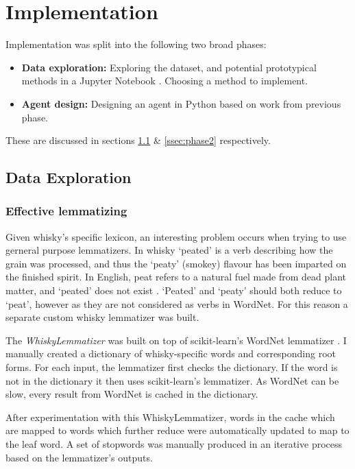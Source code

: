 \section{Implementation}\label{sec:imp}

Implementation was split into the following two broad phases:
\begin{itemize}
    \item \textbf{Data exploration:} Exploring the dataset, and potential prototypical methods in 
    a Jupyter Notebook \cite{Kluyver2016jupyter}. Choosing a method to implement.
    \item \textbf{Agent design:} Designing an agent in Python based on work from previous phase.
\end{itemize}
These are discussed in sections \ref{ssec:phase1} \& \ref{ssec:phase2} respectively.

\subsection{Data Exploration}\label{ssec:phase1}
\subsubsection{Effective lemmatizing}\label{words}
Given whisky's specific lexicon, an interesting problem occurs when trying to use gerneral purpose lemmatizers.
In whisky `peated' is a verb describing how the grain was processed, and thus the `peaty' (smokey) flavour has been 
imparted on the finished spirit.  In English, peat refers to a natural fuel made from dead plant matter,
and `peated' does not exist \cite{old}. 
`Peated' and `peaty' should both reduce to `peat', however as they are not considered 
as verbs in WordNet.  For this reason a separate custom whisky lemmatizer was built.

The \emph{WhiskyLemmatizer} was built on top of scikit-learn's WordNet lemmatizer \cite{Barupal2011}. I manually created
a dictionary of whisky-specific words and corresponding root forms. For each input, the lemmatizer first checks the 
dictionary. If the word is not in the dictionary it then uses scikit-learn's lemmatizer. As WordNet can be slow,
every result from WordNet is cached in the dictionary.

After experimentation with this WhiskyLemmatizer, words in the cache which are mapped to words which further reduce
were automatically updated to map to the leaf word. A set of stopwords was manually produced in an 
iterative process based on the lemmatizer's outputs.

